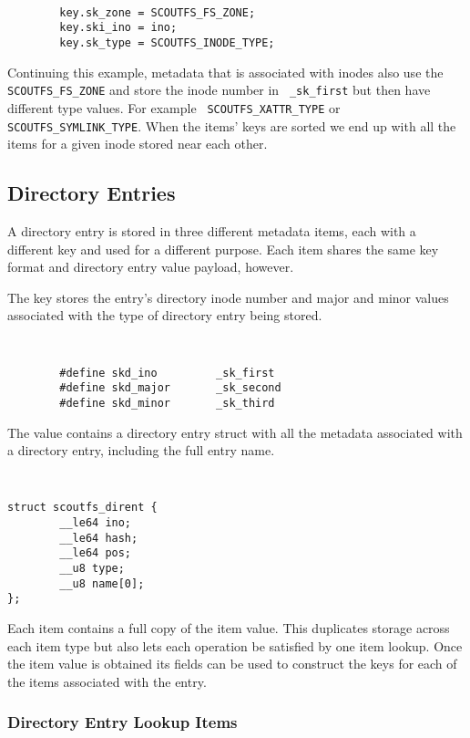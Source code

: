 \documentclass[letterpaper,twocolumn,10pt]{article}
\begin{document}
{\tt \small
\begin{verbatim}
        key.sk_zone = SCOUTFS_FS_ZONE;
        key.ski_ino = ino;
        key.sk_type = SCOUTFS_INODE_TYPE;
\end{verbatim}
}

Continuing this example, metadata that is associated with inodes also
use the {\tt SCOUTFS\_FS\_ZONE} and store the inode number in {\tt
\_sk\_first} but then have different type values.  For example {\tt
SCOUTFS\_XATTR\_TYPE} or {\tt SCOUTFS\_SYMLINK\_TYPE}.  When the items'
keys are sorted we end up with all the items for a given inode stored
near each other.

\subsection{Directory Entries}

A directory entry is stored in three different metadata items, each with
a different key and used for a different purpose.  Each item shares the
same key format and directory entry value payload, however.

The key stores the entry's directory inode number and major and minor
values associated with the type of directory entry being stored.

{\tt \small
\begin{verbatim}
        #define skd_ino         _sk_first
        #define skd_major       _sk_second
        #define skd_minor       _sk_third
\end{verbatim}
}

The value contains a directory entry struct with all the metadata
associated with a directory entry, including the full entry name.

{\tt \small
\begin{verbatim}
struct scoutfs_dirent {
        __le64 ino;
        __le64 hash;
        __le64 pos;
        __u8 type;
        __u8 name[0];
};
\end{verbatim}
}

Each item contains a full copy of the item value.  This duplicates
storage across each item type but also lets each operation be satisfied
by one item lookup.  Once the item value is obtained its fields can be
used to construct the keys for each of the items associated with the
entry.

\subsubsection{Directory Entry Lookup Items}
\end{document}
